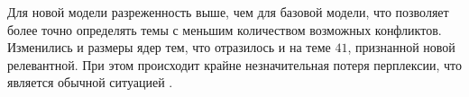 \documentclass{article}
\begin{document}
Для новой модели разреженность выше, чем для базовой модели, что позволяет более точно определять темы с меньшим количеством возможных конфликтов. Изменились и размеры ядер тем, что отразилось и на теме $41$, признанной новой релевантной. При этом происходит крайне незначительная потеря перплексии, что является обычной ситуацией \citep{artm2}.



\end{document}

